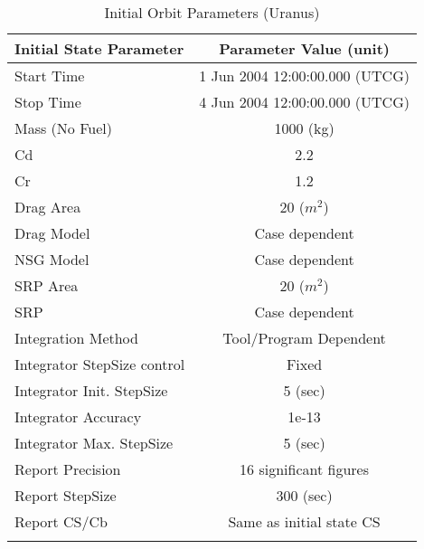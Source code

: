 \begin{table}[htbp!]
\centering \caption{Initial Orbit Parameters (Uranus)}
      \begin{tabular}{lc}
      \hline\hline
            Initial State Parameter & Parameter Value (unit)\\
            \hline
            Start Time & 1 Jun 2004 12:00:00.000 (UTCG)\\
            Stop Time & 4 Jun 2004 12:00:00.000 (UTCG)\\
            
            Mass (No Fuel) & 1000 (kg)\\
            Cd & 2.2\\
            Cr & 1.2\\
            Drag Area & 20 ($m^2$)\\
            Drag Model & Case dependent\\
            NSG Model & Case dependent\\
            SRP Area & 20 ($m^2$)\\
            SRP & Case dependent\\
            Integration Method & Tool/Program Dependent\\
            Integrator StepSize control & Fixed\\
            Integrator Init. StepSize & 5 (sec)\\
            Integrator Accuracy & 1e-13\\
            Integrator Max. StepSize & 5 (sec)\\
            Report Precision & 16 significant figures\\
            Report StepSize & 300 (sec)\\
            Report CS/Cb & Same as initial state CS\\
      \hline\hline
      \label{Table: InitStateUranus}
\end{tabular}
\end{table}

